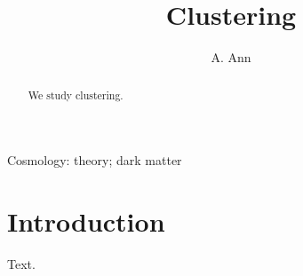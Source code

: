 
\title{Clustering}
\author{A. Ann}
\maketitle
\begin{abstract}
We study clustering.
\end{abstract}
\begin{keywords}
Cosmology: theory; dark matter

\end{keywords}
\section{Introduction}
Text.

